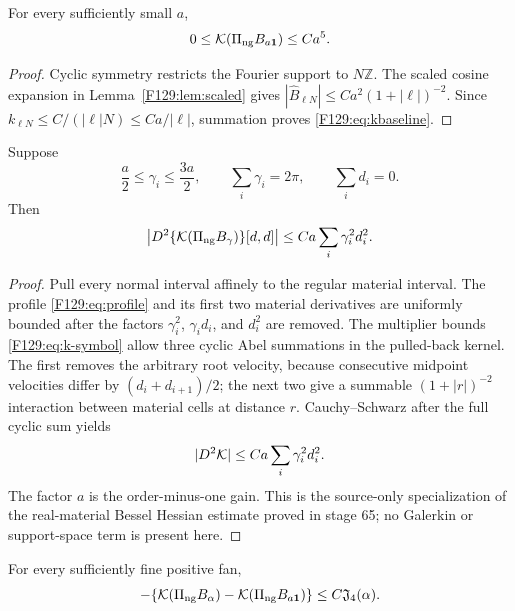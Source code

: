 \begin{lemma}\label{F129:lem:kbaseline}
For every sufficiently small \(a\),
\begin{equation}\label{F129:eq:kbaseline}
 0\le\mathcal K(\Pi_{\rm ng} B_{a\mathbf1})\le Ca^5.
\end{equation}
\end{lemma}

\begin{proof}
Cyclic symmetry restricts the Fourier support to \(N\mathbb Z\).
The scaled cosine expansion in Lemma~\ref{F129:lem:scaled} gives
\(|\widehat B_{\ell N}|\le Ca^2(1+|\ell|)^{-2}\).  Since
\(k_{\ell N}\le C/(|\ell|N)\le Ca/|\ell|\), summation proves
\eqref{F129:eq:kbaseline}.
\end{proof}

\begin{lemma}\label{F129:lem:kHessian}
Suppose
\begin{equation}
 \frac a2\le\gamma_i\le\frac{3a}{2},\qquad
 \sum_i\gamma_i=2\pi,\qquad \sum_i d_i=0.
\end{equation}
Then
\begin{equation}\label{F129:eq:kHessian}
 \left|D^2\{\mathcal K(\Pi_{\rm ng} B_\gamma)\}[d,d]\right|
 \le Ca\sum_i\gamma_i^2d_i^2.
\end{equation}
\end{lemma}

\begin{proof}
Pull every normal interval affinely to the regular material interval.
The profile \eqref{F129:eq:profile} and its first two material derivatives are
uniformly bounded after the factors \(\gamma_i^2\), \(\gamma_id_i\), and
\(d_i^2\) are removed.  The multiplier bounds \eqref{F129:eq:k-symbol} allow
three cyclic Abel summations in the pulled-back kernel.  The first removes
the arbitrary root velocity, because consecutive midpoint velocities
differ by \((d_i+d_{i+1})/2\); the next two give a summable
\((1+|r|)^{-2}\) interaction between material cells at distance \(r\).
Cauchy--Schwarz after the full cyclic sum yields
\begin{equation}
 |D^2\mathcal K|
 \le Ca\sum_i\gamma_i^2d_i^2.
\end{equation}
The factor \(a\) is the order-minus-one gain.  This is the source-only
specialization of the real-material Bessel Hessian estimate proved in
stage 65; no Galerkin or support-space term is present here.
\end{proof}

\begin{proposition}\label{F129:prop:krelative}
For every sufficiently fine positive fan,
\begin{equation}\label{F129:eq:krelative}
 -\{\mathcal K(\Pi_{\rm ng} B_\alpha)-\mathcal K(\Pi_{\rm ng} B_{a\mathbf1})\}
 \le C\mathfrak J_4(\alpha).
\end{equation}
\end{proposition}

